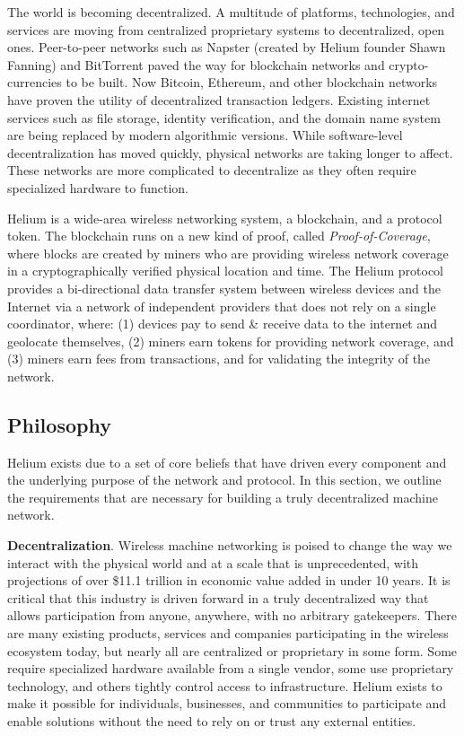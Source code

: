 \documentclass[10pt, nonatbib, nocopyrightspace, reprint]{sigplanconf}
\begin{document}
The world is becoming decentralized. A multitude of platforms, technologies, and services are moving from centralized proprietary systems to decentralized, open ones. Peer-to-peer networks such as Napster (created by Helium founder Shawn Fanning) \cite{napster} and BitTorrent paved the way for blockchain networks and crypto-currencies to be built. Now Bitcoin, Ethereum, and other blockchain networks have proven the utility of decentralized transaction ledgers. Existing internet services such as file storage, identity verification, and the domain name system are being replaced by modern algorithmic versions. While software-level decentralization has moved quickly, physical networks are taking longer to affect. These networks are more complicated to decentralize as they often require specialized hardware to function.

Helium is a wide-area wireless networking system, a blockchain, and a protocol token. The blockchain runs on a new kind of proof, called \emph{Proof-of-Coverage}, where blocks are created by miners who are providing wireless network coverage in a cryptographically verified physical location and time. The Helium protocol provides a bi-directional data transfer system between wireless devices and the Internet via a network of independent providers that does not rely on a single coordinator, where: (1) devices pay to send \& receive data to the internet and geolocate themselves, (2) miners earn tokens for providing network coverage, and (3) miners earn fees from transactions, and for validating the integrity of the network.

\subsection{Philosophy}

Helium exists due to a set of core beliefs that have driven every component and the underlying purpose of the network and protocol. In this section, we outline the requirements that are necessary for building a truly decentralized machine network.

\textbf{Decentralization}. Wireless machine networking is poised to change the way we interact with the physical world and at a scale that is unprecedented, with projections of over \$11.1 trillion in economic value added in under 10 years\cite{mckinsey}. It is critical that this industry is driven forward in a truly decentralized way that allows participation from anyone, anywhere, with no arbitrary gatekeepers. There are many existing products, services and companies participating in the wireless ecosystem today, but nearly all are centralized or proprietary in some form. Some require specialized hardware available from a single vendor, some use proprietary technology, and others tightly control access to infrastructure. Helium exists to make it possible for individuals, businesses, and communities to participate and enable solutions without the need to rely on or trust any external entities.
\end{document}
